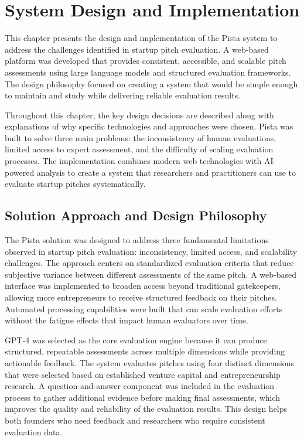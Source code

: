 \chapter{System Design and Implementation} \label{ch:problem-solution}

This chapter presents the design and implementation of the Pista system to address the challenges identified in startup pitch evaluation. A web-based platform was developed that provides consistent, accessible, and scalable pitch assessments using large language models and structured evaluation frameworks. The design philosophy focused on creating a system that would be simple enough to maintain and study while delivering reliable evaluation results.

Throughout this chapter, the key design decisions are described along with explanations of why specific technologies and approaches were chosen. Pista was built to solve three main problems: the inconsistency of human evaluations, limited access to expert assessment, and the difficulty of scaling evaluation processes. The implementation combines modern web technologies with AI-powered analysis to create a system that researchers and practitioners can use to evaluate startup pitches systematically.

\section{Solution Approach and Design Philosophy} \label{sec:solution-approach}

The Pista solution was designed to address three fundamental limitations observed in startup pitch evaluation: inconsistency, limited access, and scalability challenges. The approach centers on standardized evaluation criteria that reduce subjective variance between different assessments of the same pitch. A web-based interface was implemented to broaden access beyond traditional gatekeepers, allowing more entrepreneurs to receive structured feedback on their pitches. Automated processing capabilities were built that can scale evaluation efforts without the fatigue effects that impact human evaluators over time.

GPT-4 was selected as the core evaluation engine because it can produce structured, repeatable assessments across multiple dimensions while providing actionable feedback. The system evaluates pitches using four distinct dimensions that were selected based on established venture capital and entrepreneurship research. A question-and-answer component was included in the evaluation process to gather additional evidence before making final assessments, which improves the quality and reliability of the evaluation results. This design helps both founders who need feedback and researchers who require consistent evaluation data.


